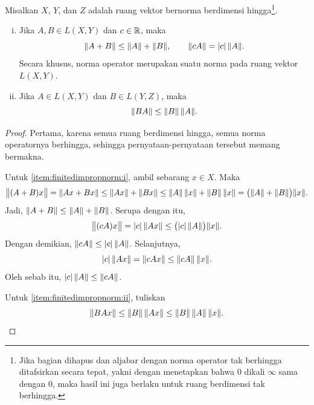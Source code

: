 \begin{prop} \label{prop:finitedimpropnorm}
\pagebreak[3]
Misalkan $X$, $Y$, dan $Z$ adalah ruang vektor bernorma berdimensi
hingga\footnote{Jika bagian  dihapus dan aljabar
dengan norma operator tak berhingga ditafsirkan secara tepat, yakni dengan menetapkan bahwa $0$ dikali
$\infty$ sama dengan 0, maka hasil ini juga berlaku untuk ruang berdimensi tak berhingga.}.
\begin{enumerate}[(i)]
\item \label{item:finitedimpropnorm:i}
Jika $A,B \in L(X,Y)$ dan $c \in {\mathbb{R}}$, maka
\begin{equation*}
\lVert {A+B} \rVert \leq \lVert {A} \rVert+\lVert {B} \rVert, \qquad \lVert {cA} \rVert = \lvert {c} \rvert \, \lVert {A} \rVert .
\end{equation*}
Secara khusus, norma operator merupakan suatu norma pada ruang vektor $L(X,Y)$.
\item \label{item:finitedimpropnorm:ii}
Jika $A \in L(X,Y)$ dan $B \in L(Y,Z)$, maka
\begin{equation*}
\lVert {BA} \rVert \leq \lVert {B} \rVert \, \lVert {A} \rVert .
\end{equation*}
\end{enumerate}
\end{prop}

\begin{proof}
Pertama, karena semua ruang berdimensi hingga, semua norma
operatornya berhingga, sehingga pernyataan-pernyataan tersebut memang bermakna.

Untuk \ref{item:finitedimpropnorm:i}, ambil sebarang $x \in X$.  Maka
\begin{equation*}
\bigl\lVert {(A+B)x} \bigr\rVert =
\lVert {Ax+Bx} \rVert \leq
\lVert {Ax} \rVert+\lVert {Bx} \rVert \leq
\lVert {A} \rVert \, \lVert {x} \rVert+\lVert {B} \rVert \,\lVert {x} \rVert =
\bigl(\lVert {A} \rVert+\lVert {B} \rVert\bigr) \lVert {x} \rVert .
\end{equation*}
Jadi, $\lVert {A+B} \rVert \leq \lVert {A} \rVert+\lVert {B} \rVert$.
Serupa dengan itu,
\begin{equation*}
\bigl\lVert {(cA)x} \bigr\rVert =
\lvert {c} \rvert \, \lVert {Ax} \rVert \leq \bigl(\lvert {c} \rvert \,\lVert {A} \rVert\bigr) \lVert {x} \rVert .
\end{equation*}
Dengan demikian, $\lVert {cA} \rVert \leq \lvert {c} \rvert \, \lVert {A} \rVert$.  Selanjutnya,
\begin{equation*}
\lvert {c} \rvert \,  \lVert {Ax} \rVert
=
\lVert {cAx} \rVert \leq \lVert {cA} \rVert \, \lVert {x} \rVert .
\end{equation*}
Oleh sebab itu, $\lvert {c} \rvert \, \lVert {A} \rVert \leq \lVert {cA} \rVert$.


Untuk \ref{item:finitedimpropnorm:ii}, tuliskan
\begin{equation*}
\lVert {BAx} \rVert \leq \lVert {B} \rVert \, \lVert {Ax} \rVert \leq \lVert {B} \rVert \, \lVert {A} \rVert \, \lVert {x} \rVert .
\qedhere
\end{equation*}
\end{proof}

